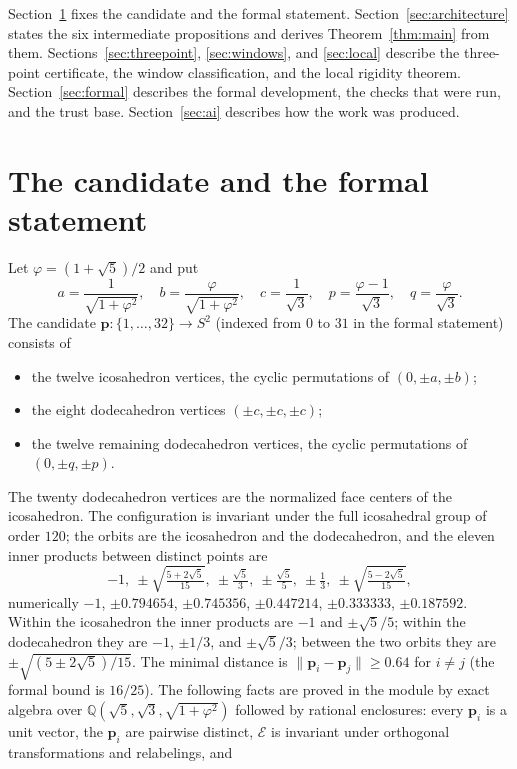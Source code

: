 \documentclass[11pt]{amsart}
\theoremstyle{definition}
\theoremstyle{remark}
\newcommand{\Q}{\mathbb{Q}}
\newcommand{\Sph}{S^{2}}
\newcommand{\norm}[1]{\lVert #1\rVert}
\newcommand{\E}{\mathcal{E}}
\newcommand{\cand}{\mathbf{p}}
\begin{document}
Section~\ref{sec:statement} fixes the candidate and the formal statement. Section~\ref{sec:architecture} states the six intermediate propositions and derives Theorem~\ref{thm:main} from them. Sections~\ref{sec:threepoint}, \ref{sec:windows}, and \ref{sec:local} describe the three-point certificate, the window classification, and the local rigidity theorem. Section~\ref{sec:formal} describes the formal development, the checks that were run, and the trust base. Section~\ref{sec:ai} describes how the work was produced.

\section{The candidate and the formal statement}\label{sec:statement}

Let $\varphi=(1+\sqrt5)/2$ and put
\[
  a=\frac{1}{\sqrt{1+\varphi^{2}}},\quad b=\frac{\varphi}{\sqrt{1+\varphi^{2}}},\quad c=\frac{1}{\sqrt3},\quad p=\frac{\varphi-1}{\sqrt3},\quad q=\frac{\varphi}{\sqrt3}.
\]
The candidate $\cand\colon\{1,\dots,32\}\to\Sph$ (indexed from $0$ to $31$ in the formal statement) consists of
\begin{itemize}
\item the twelve icosahedron vertices, the cyclic permutations of $(0,\pm a,\pm b)$;
\item the eight dodecahedron vertices $(\pm c,\pm c,\pm c)$;
\item the twelve remaining dodecahedron vertices, the cyclic permutations of $(0,\pm q,\pm p)$.
\end{itemize}
The twenty dodecahedron vertices are the normalized face centers of the icosahedron. The configuration is invariant under the full icosahedral group of order $120$; the orbits are the icosahedron and the dodecahedron, and the eleven inner products between distinct points are
\begin{equation}\label{eq:palette}
  -1,\ \pm\sqrt{\tfrac{5+2\sqrt5}{15}},\ \pm\tfrac{\sqrt5}{3},\ \pm\tfrac{\sqrt5}{5},\ \pm\tfrac13,\ \pm\sqrt{\tfrac{5-2\sqrt5}{15}},
\end{equation}
numerically $-1$, $\pm0.794654$, $\pm0.745356$, $\pm0.447214$, $\pm0.333333$, $\pm0.187592$. Within the icosahedron the inner products are $-1$ and $\pm\sqrt5/5$; within the dodecahedron they are $-1$, $\pm1/3$, and $\pm\sqrt5/3$; between the two orbits they are $\pm\sqrt{(5\pm2\sqrt5)/15}$. The minimal distance is $\norm{\cand_i-\cand_j}\ge 0.64$ for $i\ne j$ (the formal bound is $16/25$). The following facts are proved in the module  by exact algebra over $\Q(\sqrt5,\sqrt3,\sqrt{1+\varphi^2})$ followed by rational enclosures: every $\cand_i$ is a unit vector, the $\cand_i$ are pairwise distinct, $\E$ is invariant under orthogonal transformations and relabelings, and
\end{document}
